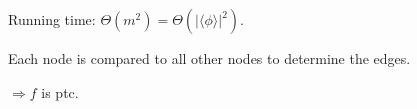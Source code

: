 Running time: $\Theta(m^2)=\Theta(|\langle\phi\rangle|^2)$.

Each node is compared to all other nodes to determine the edges.

$\Rightarrow f$ is ptc.
